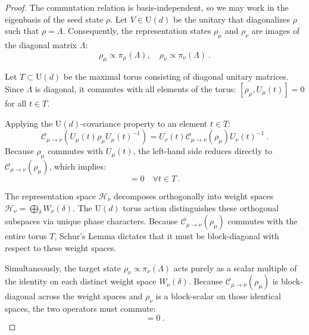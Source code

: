 \documentclass[a4paper,onecolumn,11pt]{quantumarticle}
\def\h{\mathcal{H}}
\def\C{\mathcal{C}}
\begin{document}
\begin{proof}
The commutation relation is basis-independent, so we may work in the eigenbasis of the seed state $\rho$. Let $V \in \mathrm{U}(d)$ be the unitary that diagonalizes $\rho$ such that $\rho = \Lambda$. Consequently, the representation states $\rho_\mu$ and $\rho_\nu$ are images of the diagonal matrix $\Lambda$:
\begin{equation}
    \rho_\mu \propto \pi_\mu(\Lambda), \quad \rho_\nu \propto \pi_\nu(\Lambda) \ .
\end{equation}

Let $T \subset \mathrm{U}(d)$ be the maximal torus consisting of diagonal unitary matrices. Since $\Lambda$ is diagonal, it commutes with all elements of the torus: $[\rho_\mu, U_\mu(t)] = 0$ for all $t \in T$.

Applying the $\mathrm{U}(d)$-covariance property to an element $t \in T$:
\begin{equation}
    \C_{\mu\to\nu}( U_\mu(t) \rho_\mu U_\mu(t)^{-1} ) = U_\nu(t) \C_{\mu\to\nu}(\rho_\mu) U_\nu(t)^{-1} \ .
\end{equation}
Because $\rho_\mu$ commutes with $U_\mu(t)$, the left-hand side reduces directly to $\C_{\mu\to\nu}(\rho_\mu)$, which implies:
\begin{equation}
    [\C_{\mu\to\nu}(\rho_\mu), U_\nu(t)] = 0 \quad \forall t \in T \ .
\end{equation}

The representation space $\h_\nu$ decomposes orthogonally into weight spaces $\h_\nu = \bigoplus_{\delta} W_\nu(\delta)$. The $\mathrm{U}(d)$ torus action distinguishes these orthogonal subspaces via unique phase characters. Because $\C_{\mu\to\nu}(\rho_\mu)$ commutes with the entire torus $T$, Schur's Lemma dictates that it must be block-diagonal with respect to these weight spaces.

Simultaneously, the target state $\rho_\nu \propto \pi_\nu(\Lambda)$ acts purely as a scalar multiple of the identity on each distinct weight space $W_\nu(\delta)$. Because $\C_{\mu\to\nu}(\rho_\mu)$ is block-diagonal across the weight spaces and $\rho_\nu$ is a block-scalar on those identical spaces, the two operators must commute:
\begin{equation}
    [\C_{\mu\to\nu}(\rho_\mu), \rho_\nu] = 0 \ .
\end{equation}
\end{proof}
\end{document}
